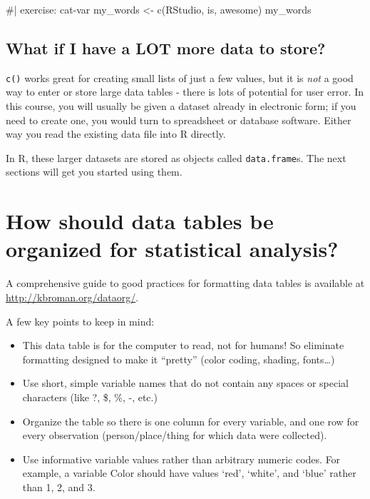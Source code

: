\documentclass[
  letterpaper,
  DIV=11,
  numbers=noendperiod]{scrreprt}
\newenvironment{Shaded}{\begin{snugshade}}{\end{snugshade}}
\newcommand{\NormalTok}[1]{\textcolor[rgb]{0.00,0.23,0.31}{#1}}
\providecommand{\tightlist}{%
  \setlength{\itemsep}{0pt}\setlength{\parskip}{0pt}}\usepackage{longtable,booktabs,array}
\theoremstyle{remark}
\begin{document}
\begin{Shaded}
\begin{Highlighting}[]
\NormalTok{\#| exercise: cat{-}var}
\NormalTok{my\_words \textless{}{-} c(\textquotesingle{}RStudio\textquotesingle{}, \textquotesingle{}is\textquotesingle{}, \textquotesingle{}awesome\textquotesingle{})}
\NormalTok{my\_words}
\end{Highlighting}
\end{Shaded}

\subsection{What if I have a LOT more data to
store?}\label{what-if-i-have-a-lot-more-data-to-store}

\texttt{c()} works great for creating small lists of just a few values,
but it is \emph{not} a good way to enter or store large data tables -
there is lots of potential for user error. In this course, you will
usually be given a dataset already in electronic form; if you need to
create one, you would turn to spreadsheet or database software. Either
way you read the existing data file into R directly.

In R, these larger datasets are stored as objects called
\texttt{data.frame}s. The next sections will get you started using them.

\section{How should data tables be organized for statistical
analysis?}\label{how-should-data-tables-be-organized-for-statistical-analysis}

A comprehensive guide to good practices for formatting data tables is
available at \url{http://kbroman.org/dataorg/}.

A few key points to keep in mind:

\begin{itemize}
\tightlist
\item
  This data table is for the computer to read, not for humans! So
  eliminate formatting designed to make it ``pretty'' (color coding,
  shading, fonts\ldots)
\item
  Use short, simple variable names that do not contain any spaces or
  special characters (like ?, \$, \%, -, etc.)
\item
  Organize the table so there is one column for every variable, and one
  row for every observation (person/place/thing for which data were
  collected).
\item
  Use informative variable values rather than arbitrary numeric codes.
  For example, a variable Color should have values `red', `white', and
  `blue' rather than 1, 2, and 3.
\end{itemize}
\end{document}
